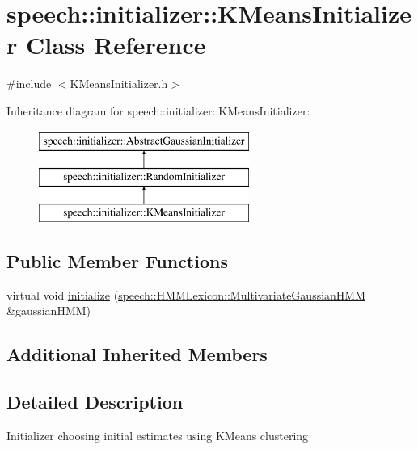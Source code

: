 \hypertarget{classspeech_1_1initializer_1_1KMeansInitializer}{\section{speech\+:\+:initializer\+:\+:K\+Means\+Initializer Class Reference}
\label{classspeech_1_1initializer_1_1KMeansInitializer}
}


{\ttfamily \#include $<$K\+Means\+Initializer.\+h$>$}

Inheritance diagram for speech\+:\+:initializer\+:\+:K\+Means\+Initializer\+:\begin{figure}[H]
\begin{center}
\leavevmode
\includegraphics[height=3.000000cm]{classspeech_1_1initializer_1_1KMeansInitializer}
\end{center}
\end{figure}
\subsection*{Public Member Functions}
\begin{DoxyCompactItemize}
\item 
virtual void \hyperlink{classspeech_1_1initializer_1_1KMeansInitializer_a300e51ef3bca3d566bffb12f2c6f5924}{initialize} (\hyperlink{classspeech_1_1HMMLexicon_1_1MultivariateGaussianHMM}{speech\+::\+H\+M\+M\+Lexicon\+::\+Multivariate\+Gaussian\+H\+M\+M} \&gaussian\+H\+M\+M)
\end{DoxyCompactItemize}
\subsection*{Additional Inherited Members}


\subsection{Detailed Description}
Initializer choosing initial estimates using K\+Means clustering 

